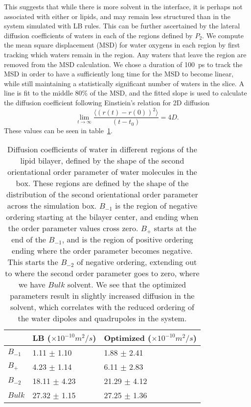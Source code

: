 This suggests that while there is more solvent in the interface, it is perhaps not
associated with either \na or lipids, and may remain less structured than
in the system simulated with LB rules.  
This can be further ascertained by the lateral diffusion coefficients of waters 
in each of the regions defined by $P_2$. 
We compute the mean square displacement (MSD) for water oxygens
in each region by first tracking which waters remain in the region. 
Any waters that leave the region are removed from the MSD calculation. 
We chose a duration of 100~ps to track the MSD in order
to have a sufficiently long time for the MSD to become linear, 
while still maintaining a statistically significant number of waters in the slice. 
A line is fit to the middle 80\% of the MSD, and the fitted
slope is used to calculate the diffusion coefficient following
Einstiein's relation for 2D diffusion
\begin{equation}
\lim_{t \to \infty}\frac{\big\langle (r(t) - r(0))^2 \big\rangle}{(t-t_0)} = 4D. 
\end{equation}
These values can be seen in table~\ref{tabch2:diff}. 
\begin{table}[h!tb]
    \caption[Diffusion coefficients of water in different regions]{Diffusion coefficients of water in different regions of the lipid bilayer, 
defined by the shape of the second orientational order parameter of water molecules in the box. 
These regions are defined by the shape of the distribution of the second 
    orientational order parameter across the simulation box. $B_{-1}$ is the region 
    of negative ordering starting at the bilayer center, and ending 
    when the order parameter values cross zero. 
    $B_{+}$ starts at the end of the $B_{-1}$, and is the region of positive ordering ending where the order parameter 
    becomes negative. This starts the $B_{-2}$ of negative ordering, extending out to where the 
second order parameter goes to zero, where we have $Bulk$ solvent.
We see that the optimized parameters result in slightly 
    increased diffusion in the solvent, which correlates with the reduced
    ordering of the water dipoles and quadrupoles in the
system.}
    \label{tabch2:diff}
    {\footnotesize
    \begin{tabularx}{\textwidth}{X|X|X|}
              &LB ($\times 10^{-10} m^2/s$)&Optimized ($\times 10^{-10} m^2/s$)\\\hline
        $B_{-1}$ &1.11 $\pm$ 1.10& 1.88 $\pm$ 2.41   \\
        $B_+$    &4.23 $\pm$ 1.14& 6.11 $\pm$ 2.83  \\
        $B_{-2}$ &18.11 $\pm$ 4.23&21.29 $\pm$ 4.12 \\
        $Bulk$   &27.32 $\pm$ 1.15 &27.25 $\pm$ 1.36 \\
              \end{tabularx}
          }
\end{table}
